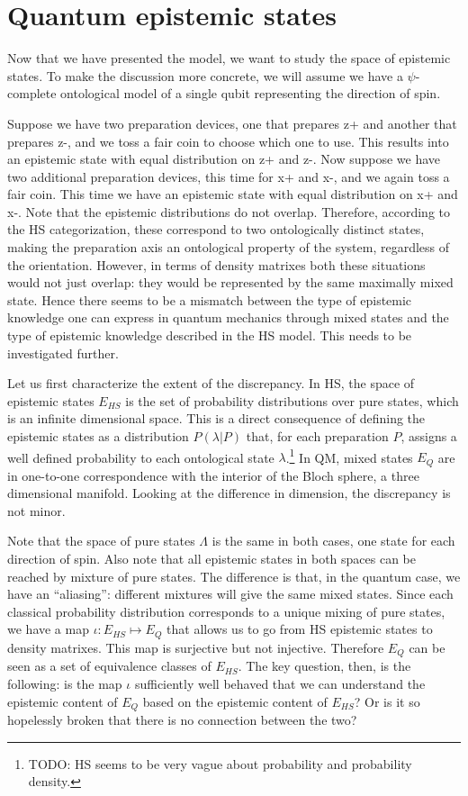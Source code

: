\documentclass[twocolumn,prl,floatfix,superscriptaddress]{revtex4-2}
\begin{document}
\section{Quantum epistemic states}
Now that we have presented the model, we want to study the space of epistemic states. To make the discussion more concrete, we will assume we have a $\psi$-complete ontological model of a single qubit representing the direction of spin.

Suppose we have two preparation devices, one that prepares z+ and another that prepares z-, and we toss a fair coin to choose which one to use. This results into an epistemic state with equal distribution on z+ and z-. Now suppose we have two additional preparation devices, this time for x+ and x-, and we again toss a fair coin. This time we have an epistemic state with equal distribution on x+ and x-. Note that the epistemic distributions do not overlap. Therefore, according to the HS categorization, these correspond to two ontologically distinct states, making the preparation axis an ontological property of the system, regardless of the orientation. However, in terms of density matrixes both these situations would not just overlap: they would be represented by the same maximally mixed state. Hence there seems to be a mismatch between the type of epistemic knowledge one can express in quantum mechanics through mixed states and the type of epistemic knowledge described in the HS model. This needs to be investigated further.

Let us first characterize the extent of the discrepancy. In HS, the space of epistemic states $E_{HS}$ is the set of probability distributions over pure states, which is an infinite dimensional space. This is a direct consequence of defining the epistemic states as a distribution $P(\lambda|P)$ that, for each preparation $P$, assigns a well defined probability to each ontological state $\lambda$.\footnote{TODO: HS seems to be very vague about probability and probability density.} In QM, mixed states $E_{Q}$ are in one-to-one correspondence with the interior of the Bloch sphere, a three dimensional manifold. Looking at the difference in dimension, the discrepancy is not minor.

Note that the space of pure states $\Lambda$ is the same in both cases, one state for each direction of spin. Also note that all epistemic states in both spaces can be reached by mixture of pure states. The difference is that, in the quantum case, we have an ``aliasing'': different mixtures will give the same mixed states. Since each classical probability distribution corresponds to a unique mixing of pure states, we have a map $\iota : E_{HS} \mapsto E_{Q}$ that allows us to go from HS epistemic states to density matrixes. This map is surjective but not injective. Therefore $E_{Q}$ can be seen as a set of equivalence classes of $E_{HS}$. The key question, then, is the following: is the map $\iota$ sufficiently well behaved that we can understand the epistemic content of $E_{Q}$ based on the epistemic content of $E_{HS}$? Or is it so hopelessly broken that there is no connection between the two?
\end{document}
